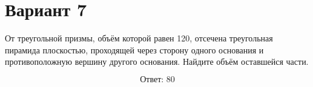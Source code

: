 \documentclass[12pt,a4paper]{article}
\begin{document}
\section*{Вариант 7}

От треугольной призмы, объём которой равен 120, отсечена треугольная пирамида плоскостью, проходящей через сторону одного основания и противоположную вершину другого основания. Найдите объём оставшейся части.

\begin{center}
\end{center}

\[
\boxed{\text{Ответ: }80}
\]
\end{document}
